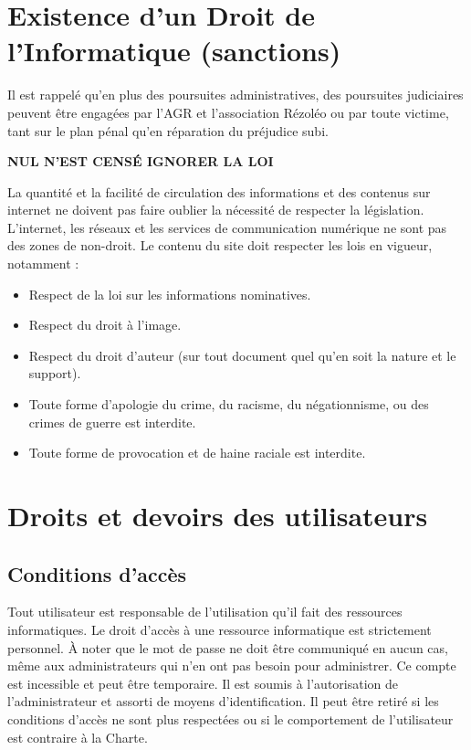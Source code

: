 \documentclass[10pt,a4paper]{article}
\begin{document}
\section{Existence d'un Droit de l'Informatique (sanctions)}
Il est rappelé qu'en plus des poursuites administratives, des poursuites judiciaires peuvent être engagées par l'AGR et l'association Rézoléo ou par toute victime, tant sur le plan pénal qu'en réparation du préjudice subi.
\begin{center}
\textbf{NUL N'EST CENSÉ IGNORER LA LOI}
\end{center}

La quantité et la facilité de circulation des informations et des contenus sur internet ne doivent pas faire oublier la nécessité de respecter la législation. L'internet, les réseaux et les services de communication numérique ne sont pas des zones de non-droit.
Le contenu du site doit respecter les lois en vigueur, notamment :
\begin{itemize}
\item Respect de la loi sur les informations nominatives.
\item Respect du droit à l'image.
\item Respect du droit d'auteur (sur tout document quel qu'en soit la nature et le support).
\item Toute forme d'apologie du crime, du racisme, du négationnisme, ou des crimes de guerre est interdite.
\item Toute forme de provocation et de haine raciale est interdite.
\end{itemize}


\section{Droits et devoirs des utilisateurs}
\subsection{Conditions d'accès}
Tout utilisateur est responsable de l'utilisation qu'il fait des ressources informatiques. Le droit d'accès à une ressource informatique est strictement personnel. À noter que le mot de passe ne doit être communiqué en aucun cas, même aux administrateurs qui n'en ont pas besoin pour administrer. Ce compte est incessible et peut être temporaire. Il est soumis à l'autorisation de l'administrateur et assorti de moyens d'identification. Il peut être retiré si les conditions d'accès ne sont plus respectées ou si le comportement de l'utilisateur est contraire à la Charte.\\
\end{document}
